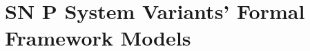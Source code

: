 \documentclass[a4paper]{article}
\begin{document}


\section{SN P System Variants' Formal Framework Models} \label{s-snp-ff}





\end{document}
